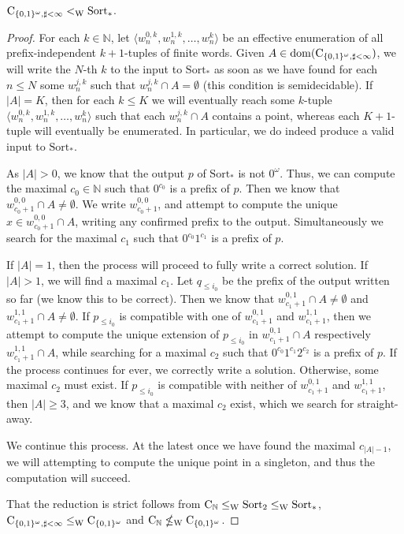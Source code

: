 \documentclass{eptcs-modified}
\begin{document}
\begin{proposition}
$\textrm{C}_{{\{0,1\}^\omega},\sharp<\infty} <_{\textrm{W}} \mathrm{Sort}_*$.
\begin{proof}
For each $k \in \mathbb{N}$, let $\langle w_n^{0,k},w_n^{1,k},\ldots,w_n^{k}\rangle$ be an effective enumeration of all prefix-independent $k+1$-tuples of finite words. Given $A \in \operatorname{dom}(\textrm{C}_{{\{0,1\}^\omega},\sharp<\infty})$, we will write the $N$-th $k$ to the input to $\mathrm{Sort}_*$ as soon as we have found for each $n \leq N$ some $w_n^{j,k}$ such that $w_n^{j,k} \cap A = \emptyset$ (this condition is semidecidable). If $|A| = K$, then for each $k \leq K$ we will eventually reach some $k$-tuple $\langle w_n^{0,k},w_n^{1,k},\ldots,w_n^{k}\rangle$ such that each $w_n^{j,k} \cap A$ contains a point, whereas each $K + 1$-tuple will eventually be enumerated. In particular, we do indeed produce a valid input to $\mathrm{Sort}_*$.

As $|A| > 0$, we know that the output $p$ of $\mathrm{Sort}_*$ is not $0^\omega$. Thus, we can compute the maximal $c_0 \in \mathbb{N}$ such that $0^{c_0}$ is a prefix of $p$. Then we know that $w_{c_0+1}^{0,0} \cap A \neq \emptyset$. We write $w_{c_0+1}^{0,0}$, and attempt to compute the unique $x \in w_{c_0+1}^{0,0} \cap A$, writing any confirmed prefix to the output. Simultaneously we search for the maximal $c_1$ such that $0^{c_0}1^{c_1}$ is a prefix of $p$.

If $|A| = 1$, then the process will proceed to fully write a correct solution. If $|A| > 1$, we will find a maximal $c_1$. Let $q_{\leq i_0}$ be the prefix of the output written so far (we know this to be correct). Then we know that $w_{c_1+1}^{0,1} \cap A \neq \emptyset$ and $w_{c_1+1}^{1,1} \cap A \neq \emptyset$. If $p_{\leq i_0}$ is compatible with one of $w_{c_1+1}^{0,1}$ and $w_{c_1+1}^{1,1}$, then we attempt to compute the unique extension of $p_{\leq i_0}$ in $w_{c_1+1}^{0,1} \cap A$ respectively $w_{c_1+1}^{1,1} \cap A$, while searching for a maximal $c_2$ such that $0^{c_0}1^{c_1}2^{c_2}$ is a prefix of $p$. If the process continues for ever, we correctly write a solution. Otherwise, some maximal $c_2$ must exist. If $p_{\leq i_0}$ is compatible with neither of $w_{c_1+1}^{0,1}$ and $w_{c_1+1}^{1,1}$, then $|A| \geq 3$, and we know that a maximal $c_2$ exist, which we search for straight-away.

We continue this process. At the latest once we have found the maximal $c_{|A|-1}$, we will attempting to compute the unique point in a singleton, and thus the computation will succeed.

That the reduction is strict follows from $\textrm{C}_\mathbb{N} \leq_{\textrm{W}} \mathrm{Sort}_2 \leq_{\textrm{W}} \mathrm{Sort}_*$, $\textrm{C}_{{\{0,1\}^\omega},\sharp<\infty} \leq_{\textrm{W}} \textrm{C}_{\{0,1\}^\omega}$ and $\textrm{C}_\mathbb{N} \nleq_{\textrm{W}} \textrm{C}_{\{0,1\}^\omega}$.
\end{proof}
\end{proposition}
\end{document}
